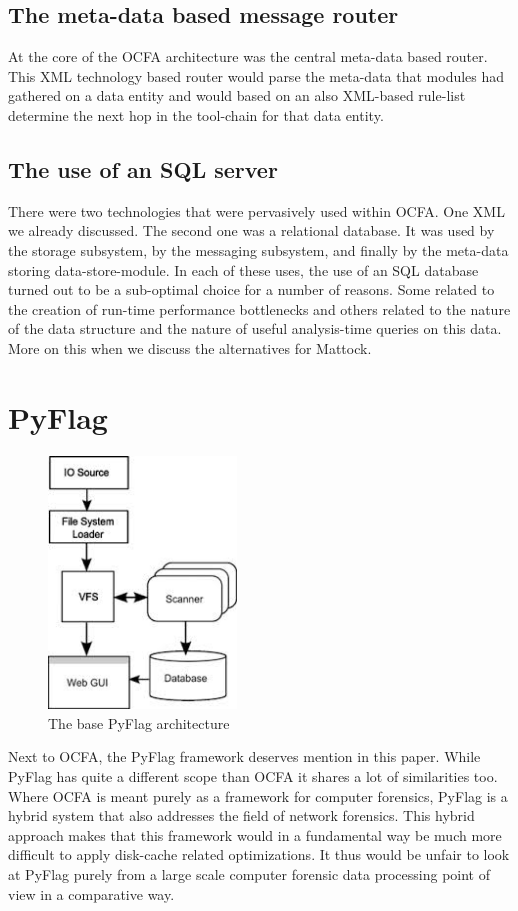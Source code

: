 \subsection{The meta-data based message router}
At the core of the OCFA architecture was the central meta-data based router. This XML technology based router would parse the meta-data that modules had gathered on a data entity and would based on an also XML-based rule-list determine the next hop in the tool-chain for that data entity. 
\subsection{The use of an SQL server}
There were two technologies that were pervasively used within OCFA. One XML we already discussed. The second one was a relational database. It was used by the storage subsystem, by the messaging subsystem, and finally by the meta-data storing data-store-module. In each of these uses, the use of an SQL database turned out to be a sub-optimal choice for a number of reasons. Some related to the creation of run-time performance bottlenecks and others related to the nature of the data structure and the nature of useful analysis-time queries on this data. More on this when we discuss the alternatives for Mattock.
\section{PyFlag}
\begin{figure}
\centering
\includegraphics[width=50mm]{mattock/pyflag.jpg}
\caption{The base PyFlag architecture}
\label{fig:FlowInOut}
\end{figure}
Next to OCFA, the PyFlag framework deserves mention in this paper. While PyFlag has quite a different scope than OCFA it shares a lot of similarities too. Where OCFA is meant purely as a framework for computer forensics, PyFlag is a hybrid system that also addresses the field of network forensics. This hybrid approach makes that this framework would in a fundamental way be much more difficult to apply disk-cache related optimizations. It thus would be unfair to look at PyFlag purely from a large scale computer forensic data processing point of view in a comparative way. 
